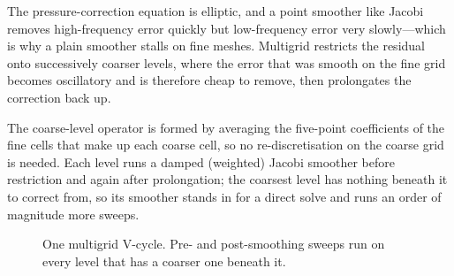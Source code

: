 \documentclass[11pt]{article}
\begin{document}
The pressure-correction equation is elliptic, and a point smoother like Jacobi removes
high-frequency error quickly but low-frequency error very slowly---which is why a plain
smoother stalls on fine meshes. Multigrid restricts the residual onto successively
coarser levels, where the error that was smooth on the fine grid becomes oscillatory and
is therefore cheap to remove, then prolongates the correction back up.

The coarse-level operator is formed by averaging the five-point coefficients of the fine
cells that make up each coarse cell, so no re-discretisation on the coarse grid is
needed. Each level runs a damped (weighted) Jacobi smoother before restriction and again
after prolongation; the coarsest level has nothing beneath it to correct from, so its
smoother stands in for a direct solve and runs an order of magnitude more sweeps.

\begin{figure}[h]
\centering
{}
\caption{One multigrid V-cycle. Pre- and post-smoothing sweeps run on every level that
has a coarser one beneath it.}
\label{fig:vcycle}
\end{figure}
\end{document}

